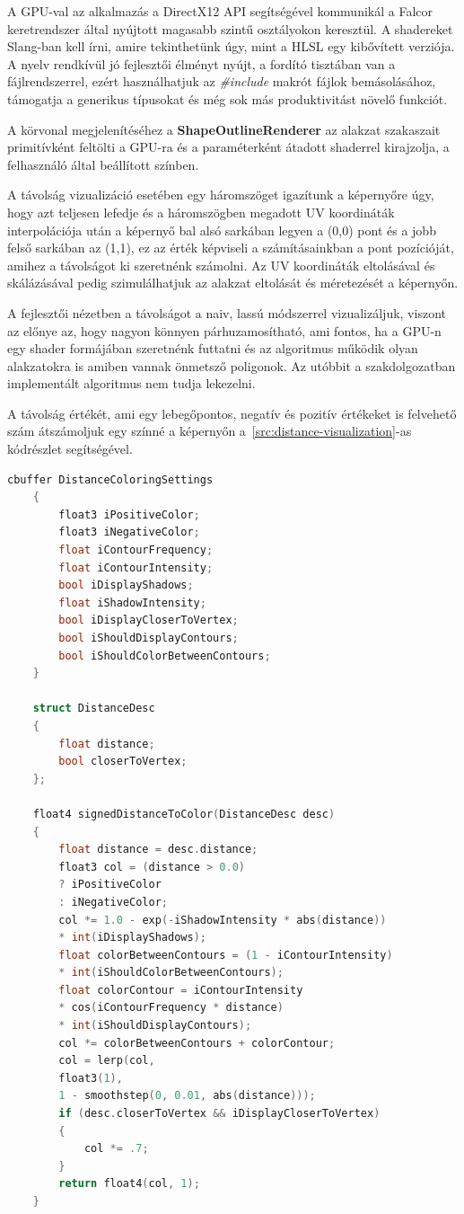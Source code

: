 A GPU-val az alkalmazás a DirectX12 API segítségével kommunikál a Falcor keretrendszer\cite{falcor} által nyújtott magasabb szintű osztályokon keresztül. A shadereket Slang-ban\cite{slang} kell írni, amire tekinthetünk úgy, mint a HLSL egy kibővített verziója. A nyelv rendkívül jó fejlesztői élményt nyújt, a fordító tisztában van a fájlrendszerrel, ezért használhatjuk az \textit{\#include} makrót fájlok bemásolásához, támogatja a generikus típusokat és még sok más produktivitást növelő funkciót.

A körvonal megjelenítéséhez a \textbf{ShapeOutlineRenderer} az alakzat szakaszait primitívként feltölti a GPU-ra és a paraméterként átadott shaderrel kirajzolja, a felhasználó által beállított színben.

A távolság vizualizáció esetében egy háromszöget igazítunk a képernyőre úgy, hogy azt teljesen lefedje és a háromszögben megadott UV koordináták interpolációja után a képernyő bal alsó sarkában legyen a (0,0) pont és a jobb felső sarkában az (1,1), ez az érték képviseli a számításainkban a pont pozícióját, amihez a távolságot ki szeretnénk számolni. Az UV koordináták eltolásával és skálázásával pedig szimulálhatjuk az alakzat eltolását és méretezését a képernyőn.

A fejlesztői nézetben a távolságot a naiv\cite{inigoquilez2d}, lassú módszerrel vizualizáljuk, viszont az előnye az, hogy nagyon könnyen párhuzamosítható, ami fontos, ha a GPU-n egy shader formájában szeretnénk futtatni és az algoritmus működik olyan alakzatokra is amiben vannak önmetsző poligonok. Az utóbbit a szakdolgozatban implementált algoritmus nem tudja lekezelni.

A távolság értékét, ami egy lebegőpontos, negatív és pozitív értékeket is felvehető szám átszámoljuk egy színné a képernyőn a~\ref{src:distance-visualization}-as kódrészlet segítségével\cite{inigoquilezshader}.

\begin{lstlisting}[language=c]
	cbuffer DistanceColoringSettings
	{
		float3 iPositiveColor;
		float3 iNegativeColor;
		float iContourFrequency;
		float iContourIntensity;
		bool iDisplayShadows;
		float iShadowIntensity;
		bool iDisplayCloserToVertex;
		bool iShouldDisplayContours;
		bool iShouldColorBetweenContours;
	}

	struct DistanceDesc
	{
		float distance;
		bool closerToVertex;
	};

	float4 signedDistanceToColor(DistanceDesc desc)
	{
		float distance = desc.distance;
		float3 col = (distance > 0.0)
		? iPositiveColor
		: iNegativeColor;
		col *= 1.0 - exp(-iShadowIntensity * abs(distance))
		* int(iDisplayShadows);
		float colorBetweenContours = (1 - iContourIntensity)
		* int(iShouldColorBetweenContours);
		float colorContour = iContourIntensity
		* cos(iContourFrequency * distance)
		* int(iShouldDisplayContours);
		col *= colorBetweenContours + colorContour;
		col = lerp(col,
		float3(1),
		1 - smoothstep(0, 0.01, abs(distance)));
		if (desc.closerToVertex && iDisplayCloserToVertex)
		{
			col *= .7;
		}
		return float4(col, 1);
	}

\end{lstlisting}

